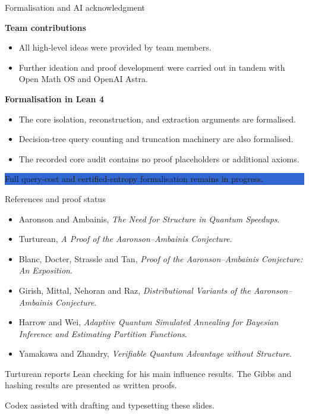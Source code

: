 \documentclass[aspectratio=169,11pt]{beamer}
\begin{document}
\begin{frame}{Formalisation and AI acknowledgment}
\small

\textbf{Team contributions}
\begin{itemize}
  \item All high-level ideas were provided by team members.
  \item Further ideation and proof development were carried out
    in tandem with Open Math OS and OpenAI Astra.
\end{itemize}

\medskip
\textbf{Formalisation in Lean 4}
\begin{itemize}
  \item The core isolation, reconstruction, and extraction
    arguments are formalised.
  \item Decision-tree query counting and truncation
    machinery are also formalised.
  \item The recorded core audit contains no proof placeholders
    or additional axioms.
\end{itemize}

\medskip
\colorbox{Highlight}{%
  \parbox{\dimexpr\linewidth-2\fboxsep\relax}{%
    \centering
    Full query-cost and certified-entropy formalisation
    remains in progress.}}

\end{frame}

\begin{frame}{References and proof status}
\small
\begin{itemize}
\item Aaronson and Ambainis, \emph{The Need for Structure in Quantum Speedups}.
\item Turturean, \emph{A Proof of the Aaronson--Ambainis Conjecture}.
\item Blanc, Docter, Strassle and Tan, \emph{Proof of the Aaronson--Ambainis Conjecture: An Exposition}.
\item Girish, Mittal, Nehoran and Raz, \emph{Distributional Variants of the Aaronson--Ambainis Conjecture}.
\item Harrow and Wei, \emph{Adaptive Quantum Simulated Annealing for Bayesian Inference and Estimating Partition Functions}.
\item Yamakawa and Zhandry, \emph{Verifiable Quantum Advantage without Structure}.
\end{itemize}
\medskip
Turturean reports Lean checking for his main influence results. The Gibbs and hashing results are presented as written proofs.\par\smallskip Codex assisted with drafting and typesetting these slides.
\end{frame}
\end{document}
